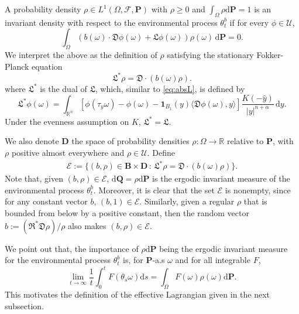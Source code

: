 \documentclass[11pt,reqno]{amsart}
\theoremstyle{definition}
\theoremstyle{remark}
\numberwithin{equation}{section}
\def\bP{\mathbf{P}}
\def\upd{\mathrm{d}}
\begin{document}
\medskip 

A probability density $\rho \in L^{1}(\Omega, \mathscr{F}, \bP)$ with $\rho \geq 0$ and $\int_{\Omega}\rho \mathrm{d}\bP=1$ is an invariant density with respect to the environmental process $\theta^b_t$ if for every $\phi \in \mathscr{U}$,
\begin{equation}
\label{eq:FPweak}
    \int_{\Omega} \left( b(\omega)\cdot\mathfrak{D} \phi(\omega) + \mathfrak{L}\phi(\omega)\right)\rho(\omega)\,\mathrm{d}\bP = 0.
\end{equation}
We interpret the above as the definition of $\rho$ satisfying the stationary Fokker-Planck equation
\begin{equation*}
\mathfrak{L}^*\rho=\mathfrak{D}\cdot  (b(\omega) \rho).
\end{equation*}
where $\mathfrak{L}^*$ is the dual of $\mathfrak{L}$, which, similar to \eqref{eq:absL}, is defined by
\begin{equation*}
\mathfrak{L}^* \phi(\omega)  = \int_{\mathbb{R}^{n}} [\phi(\tau_{y}\omega)-\phi(\omega)-\mathbf{1}_{B_1}(y)\langle \mathfrak{D} \phi(\omega), y\rangle ]\frac{K(-\hat{y})}{|y|^{n+\alpha}}\,\mathrm{d}y.
\end{equation*}
Under the evenness assumption on $K$, $\mathfrak{L}^*=\mathfrak{L}$. %

We also denote $\mathbf{D}$ the space of probability densities $\rho:\Omega\rightarrow \mathbb{R}$ relative to $\bP$, with $\rho$ positive almost everywhere and $\rho \in \mathscr{U}$. Define 
\begin{align*}
    \mathscr{E}:=\{(b,\rho)\in\mathbf{B}\times\mathbf{D} \,:\,  \mathfrak{L}^*\rho=\mathfrak{D}\cdot  (b(\omega) \rho) \}.   
\end{align*}
Note that, given $(b,\rho) \in \mathscr{E}$, $\upd\mathbf{Q} = \rho\upd \mathbf{P}$ is the ergodic invariant measure of the environmental process $\theta_t^b$. Moreover, it is clear that the set $\mathscr{E}$ is nonempty, since for any constant vector $b$, $(b,1) \in \mathscr{E}$. Similarly, given a regular $\rho$ that is bounded from below by a positive constant, then the random vector $b:= (\mathfrak{R}^* \mathfrak{D}\rho)/\rho$ also makes $(b,\rho) \in \mathscr{E}$. 

We point out that, the importance of $\rho \mathrm{d}\bP$ being the ergodic invariant measure for the environmental process $\theta^b_t$ is, for $\bP$-a.s $\omega$ and for all integrable $F$, 
\begin{equation*}
    \lim_{t\rightarrow\infty}\frac{1}{t}\int^{t}_{0}F(\theta_s \omega)\mathrm{d}s = \int_{\Omega} F(\omega)\rho(\omega)\mathrm{d}\bP.
\end{equation*}
This motivates the definition of the effective Lagrangian given in the next subsection.
\end{document}
